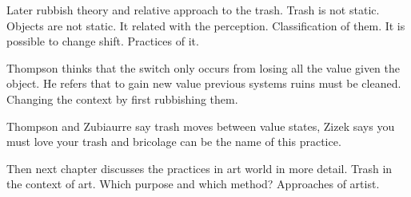 
Later rubbish theory and relative approach to the trash. Trash is not static. Objects are not static. It related with the perception. Classification of them. It is possible to change shift. Practices of it.

Thompson thinks that the switch only occurs from losing all the value given the object. He refers that to gain new value previous systems ruins must be cleaned. Changing the context by first rubbishing them.

Thompson and Zubiaurre say trash moves between value states, Zizek says you must love your trash and bricolage can be the name of this practice.

Then next chapter discusses the practices in art world in more detail. Trash in the context of art. Which purpose and which method? Approaches of artist.
